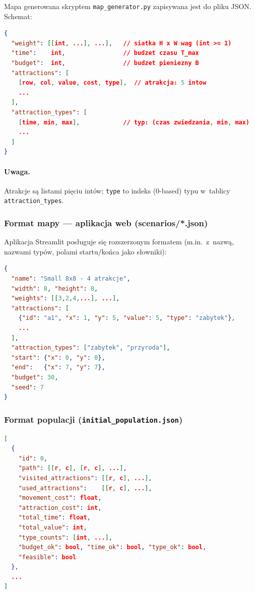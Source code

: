 Mapa generowana skryptem \texttt{map\_generator.py} zapisywana jest do pliku
JSON. Schemat:

\begin{lstlisting}[language=json, caption={Schemat \texttt{map.json}}]
{
  "weight": [[int, ...], ...],   // siatka H x W wag (int >= 1)
  "time":    int,                // budzet czasu T_max
  "budget":  int,                // budzet pieniezny B
  "attractions": [
    [row, col, value, cost, type],  // atrakcja: 5 intow
    ...
  ],
  "attraction_types": [
    [time, min, max],            // typ: (czas zwiedzania, min, max)
    ...
  ]
}
\end{lstlisting}

\paragraph{Uwaga.} Atrakcje są listami pięciu intów; \texttt{type} to
indeks (0-based) typu w~tablicy \texttt{attraction\_types}.

\subsubsection{Format mapy --- aplikacja web (scenarios/*.json)}

Aplikacja Streamlit posługuje się rozszerzonym formatem (m.in.\ z~nazwą,
nazwami typów, polami startu/końca jako słowniki):

\begin{lstlisting}[language=json, caption={Schemat \texttt{scenarios/*.json} (wycinek z \texttt{small.json})}]
{
  "name": "Small 8x8 - 4 atrakcje",
  "width": 8, "height": 8,
  "weights": [[3,2,4,...], ...],
  "attractions": [
    {"id": "a1", "x": 1, "y": 5, "value": 5, "type": "zabytek"},
    ...
  ],
  "attraction_types": ["zabytek", "przyroda"],
  "start": {"x": 0, "y": 0},
  "end":   {"x": 7, "y": 7},
  "budget": 30,
  "seed": 7
}
\end{lstlisting}

\subsubsection{Format populacji (\texttt{initial\_population.json})}

\begin{lstlisting}[language=json]
[
  {
    "id": 0,
    "path": [[r, c], [r, c], ...],
    "visited_attractions": [[r, c], ...],
    "used_attractions":    [[r, c], ...],
    "movement_cost": float,
    "attraction_cost": int,
    "total_time": float,
    "total_value": int,
    "type_counts": [int, ...],
    "budget_ok": bool, "time_ok": bool, "type_ok": bool,
    "feasible": bool
  },
  ...
]
\end{lstlisting}

